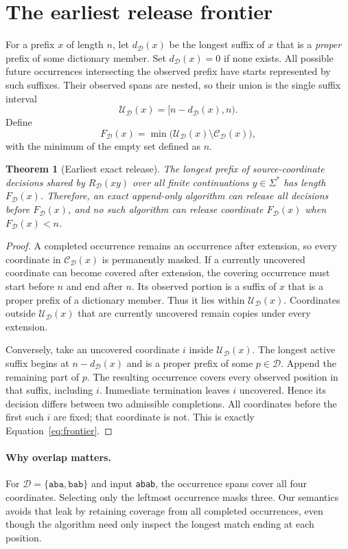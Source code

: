 \documentclass[11pt,a4paper]{article}
\newtheorem{theorem}{Theorem}
\newcommand{\D}{\mathcal{D}}
\newcommand{\C}{\mathcal{C}}
\newcommand{\U}{\mathcal{U}}
\begin{document}
\section{The earliest release frontier}
For a prefix $x$ of length $n$, let $d_\D(x)$ be the longest suffix of $x$ that is a \emph{proper} prefix of some dictionary member. Set $d_\D(x)=0$ if none exists. All possible future occurrences intersecting the observed prefix have starts represented by such suffixes. Their observed spans are nested, so their union is the single suffix interval
\begin{equation}
\U_\D(x)=[n-d_\D(x),n).
\end{equation}
Define
\begin{equation}\label{eq:frontier}
F_\D(x)=\min\bigl(\U_\D(x)\setminus\C_\D(x)\bigr),
\end{equation}
with the minimum of the empty set defined as $n$.

\begin{theorem}[Earliest exact release]\label{thm:frontier}
The longest prefix of source-coordinate decisions shared by $R_\D(xy)$ over all finite continuations $y\in\Sigma^*$ has length $F_\D(x)$. Therefore, an exact append-only algorithm can release all decisions before $F_\D(x)$, and no such algorithm can release coordinate $F_\D(x)$ when $F_\D(x)<n$.
\end{theorem}
\begin{proof}
A completed occurrence remains an occurrence after extension, so every coordinate in $\C_\D(x)$ is permanently masked. If a currently uncovered coordinate can become covered after extension, the covering occurrence must start before $n$ and end after $n$. Its observed portion is a suffix of $x$ that is a proper prefix of a dictionary member. Thus it lies within $\U_\D(x)$. Coordinates outside $\U_\D(x)$ that are currently uncovered remain copies under every extension.

Conversely, take an uncovered coordinate $i$ inside $\U_\D(x)$. The longest active suffix begins at $n-d_\D(x)$ and is a proper prefix of some $p\in\D$. Append the remaining part of $p$. The resulting occurrence covers every observed position in that suffix, including $i$. Immediate termination leaves $i$ uncovered. Hence its decision differs between two admissible completions. All coordinates before the first such $i$ are fixed; that coordinate is not. This is exactly Equation~\eqref{eq:frontier}.
\end{proof}

\paragraph{Why overlap matters.}
For $\D=\{\texttt{aba},\texttt{bab}\}$ and input \texttt{abab}, the occurrence spans cover all four coordinates. Selecting only the leftmost occurrence masks three. Our semantics avoids that leak by retaining coverage from all completed occurrences, even though the algorithm need only inspect the longest match ending at each position.
\end{document}
